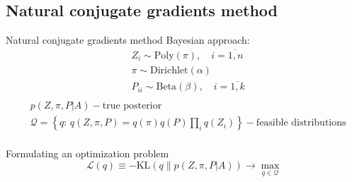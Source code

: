 \documentclass{beamer}
\theoremstyle{definition}
\theoremstyle{plain}
\theoremstyle{remark}
\begin{document}
        \subsection{Natural conjugate gradients method}
			\begin{frame}{Natural conjugate gradients method} %
                Bayesian approach:
                \begin{equation}
                    \begin{aligned}
                    \nonumber
                        & Z_i \sim \text{Poly}(\pi), \quad i=\overline{1, n} \\
                        & \pi \sim \text{Dirichlet}(\alpha) \\
                        & P_{ii} \sim \text{Beta}(\beta), \quad i = \overline{1,k} \\
                    \end{aligned}
                \end{equation}
                \begin{equation}
                    \begin{aligned}
                    \nonumber
                        & p(Z, \pi, P | A) - \text{true posterior} \\
                        & \mathcal Q = \left\{ q:\, q(Z, \pi, P) = q(\pi)q(P) \prod\limits_i q(Z_i) \right\} - \text{feasible distributions} \\
                    \end{aligned}
                \end{equation}


				\begin{block}{Formulating an optimization problem}
                    \begin{equation*}
                        \mathcal L(q) \equiv -\text{KL}\left(q \| p(Z, \pi, P | A)\right) \longrightarrow \max\limits_{q \in \mathcal Q}
                    \end{equation*}
				\end{block}
			\end{frame}
\end{document}
